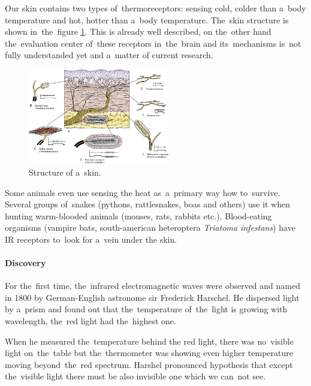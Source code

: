 Our skin contains two types of~thermoreceptors: sensing cold, colder than a~body temperature and
hot, hotter than a~body temperature. The~skin structure is shown in~the~figure \ref{fig:skin}.
This is already well described, on the~other hand the~evaluation center of~these receptors in~the~brain
and its~mechanisms is~not fully understanded yet and a~matter of current research. \cite{BodilySenses}

\begin{figure}[h!]
\begin{center}
\includegraphics[width=0.55\textwidth]{obrazky-figures/skin.jpg}
\caption{Structure of a~skin. \cite{SkinStructure}\label{fig:skin}}
\end{center}    
\end{figure}

Some animals even use sensing the heat as~a~primary way how to~survive. Several groups of~snakes
(pythons, rattlesnakes, boas and others) use it when hunting warm-blooded animals (mouses, rats, rabbits etc.).
Blood-eating organisms (vampire bats, south-american heteroptera {\it Triatoma infestans})
have IR receptors to~look for a~vein under the skin.\cite{SnakeInfrared}


\paragraph{Discovery}
For the~first time, the~infrared electromagnetic waves were observed and named in 1800 by German-English
astronome sir Frederick Harschel. He dispersed light by a~prism and found out that the~temperature
of~the~light is growing with wavelength, the~red light had the~highest one.

When he measured the~temperature behind the red light, there was no~visible light on~the~table but
the~thermometer was showing even higher temperature moving beyond~the~red spectrum. Harshel
pronounced hypothesis that except the~visible light there must be also invisible one which we can~not
see. \cite{HerschelLife}


